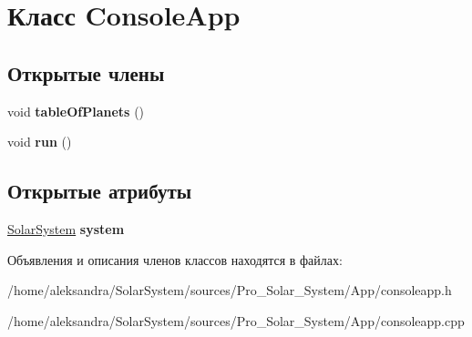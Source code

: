 \hypertarget{classConsoleApp}{\section{Класс Console\-App}
\label{classConsoleApp}
}
\subsection*{Открытые члены}
\begin{DoxyCompactItemize}
\item 
\hypertarget{classConsoleApp_a5b0ecea852f7d10c8b35363aeb6a1fbf}{void {\bfseries table\-Of\-Planets} ()}\label{classConsoleApp_a5b0ecea852f7d10c8b35363aeb6a1fbf}

\item 
\hypertarget{classConsoleApp_aeb871e646079782bb0f4e38259c36514}{void {\bfseries run} ()}\label{classConsoleApp_aeb871e646079782bb0f4e38259c36514}

\end{DoxyCompactItemize}
\subsection*{Открытые атрибуты}
\begin{DoxyCompactItemize}
\item 
\hypertarget{classConsoleApp_a6ea11db8bbb41a0d0bc478080281268d}{\hyperlink{classSolarSystem}{Solar\-System} {\bfseries system}}\label{classConsoleApp_a6ea11db8bbb41a0d0bc478080281268d}

\end{DoxyCompactItemize}


Объявления и описания членов классов находятся в файлах\-:\begin{DoxyCompactItemize}
\item 
/home/aleksandra/\-Solar\-System/sources/\-Pro\-\_\-\-Solar\-\_\-\-System/\-App/consoleapp.\-h\item 
/home/aleksandra/\-Solar\-System/sources/\-Pro\-\_\-\-Solar\-\_\-\-System/\-App/consoleapp.\-cpp\end{DoxyCompactItemize}
